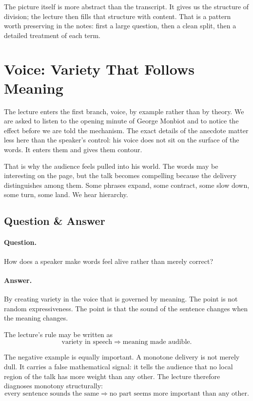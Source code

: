 The picture itself is more abstract than the transcript. It gives us the structure of division; the lecture then fills that structure with content. That is a pattern worth preserving in the notes: first a large question, then a clean split, then a detailed treatment of each term.

\section{Voice: Variety That Follows Meaning}

The lecture enters the first branch, voice, by example rather than by theory. We are asked to listen to the opening minute of George Monbiot and to notice the effect before we are told the mechanism. The exact details of the anecdote matter less here than the speaker's control: his voice does not sit on the surface of the words. It enters them and gives them contour.

That is why the audience feels pulled into his world. The words may be interesting on the page, but the talk becomes compelling because the delivery distinguishes among them. Some phrases expand, some contract, some slow down, some turn, some land. We hear hierarchy.

\subsection{Question \& Answer}

\paragraph{Question.} How does a speaker make words feel alive rather than merely correct?

\paragraph{Answer.} By creating variety in the voice that is governed by meaning. The point is not random expressiveness. The point is that the sound of the sentence changes when the meaning changes.

The lecture's rule may be written as
\begin{equation}
\text{variety in speech} \Longrightarrow \text{meaning made audible}.
\end{equation}

The negative example is equally important. A monotone delivery is not merely dull. It carries a false mathematical signal: it tells the audience that no local region of the talk has more weight than any other. The lecture therefore diagnoses monotony structurally:
\begin{equation}
\text{every sentence sounds the same} \Longrightarrow \text{no part seems more important than any other}.
\end{equation}

